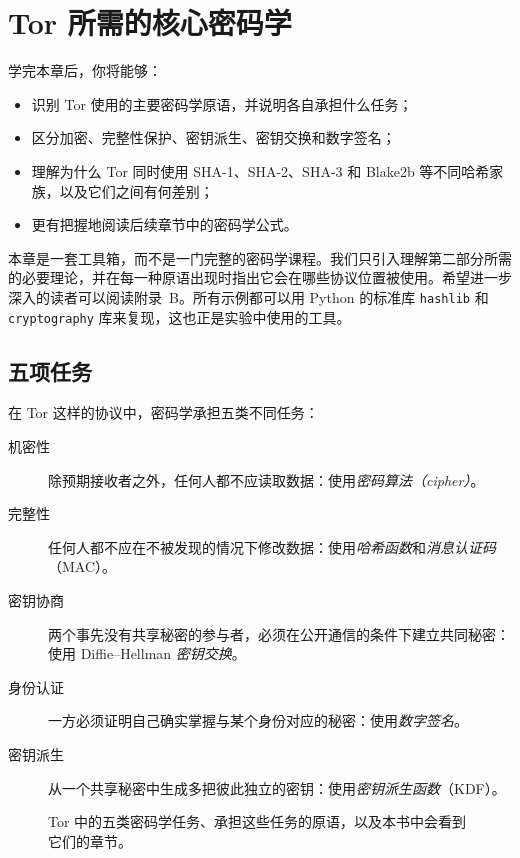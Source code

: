 \chapter{Tor 所需的核心密码学}\label{cap:05-crittografia}

\begin{obiettivi}
学完本章后，你将能够：
\begin{itemize}[nosep]
  \item 识别 Tor 使用的主要密码学原语，并说明各自承担什么任务；
  \item 区分加密、完整性保护、密钥派生、密钥交换和数字签名；
  \item 理解为什么 Tor 同时使用 SHA-1、SHA-2、SHA-3 和 Blake2b 等不同哈希家族，以及它们之间有何差别；
  \item 更有把握地阅读后续章节中的密码学公式。
\end{itemize}
\end{obiettivi}

本章是一套工具箱，而不是一门完整的密码学课程。我们只引入理解第二部分所需的必要理论，并在每一种原语出现时指出它会在哪些协议位置被使用。希望进一步深入的读者可以阅读附录~B。所有示例都可以用 Python 的标准库 \texttt{hashlib} 和 \texttt{cryptography} 库来复现，这也正是实验中使用的工具。

\section{五项任务}\label{sec:cripto-compiti}

在 Tor 这样的协议中，密码学承担五类不同任务：
\begin{description}
  \item[机密性] 除预期接收者之外，任何人都不应读取数据：使用\emph{密码算法（cipher）}。
  \item[完整性] 任何人都不应在不被发现的情况下修改数据：使用\emph{哈希函数}和\emph{消息认证码}（MAC）。
  \item[密钥协商] 两个事先没有共享秘密的参与者，必须在公开通信的条件下建立共同秘密：使用 Diffie--Hellman \emph{密钥交换}。
  \item[身份认证] 一方必须证明自己确实掌握与某个身份对应的秘密：使用\emph{数字签名}。
  \item[密钥派生] 从一个共享秘密中生成多把彼此独立的密钥：使用\emph{密钥派生函数}（KDF）。
\end{description}
\begin{figure}[htbp]
\centering

\caption{Tor 中的五类密码学任务、承担这些任务的原语，以及本书中会看到它们的章节。}
\label{fig:compiti}
\end{figure}

